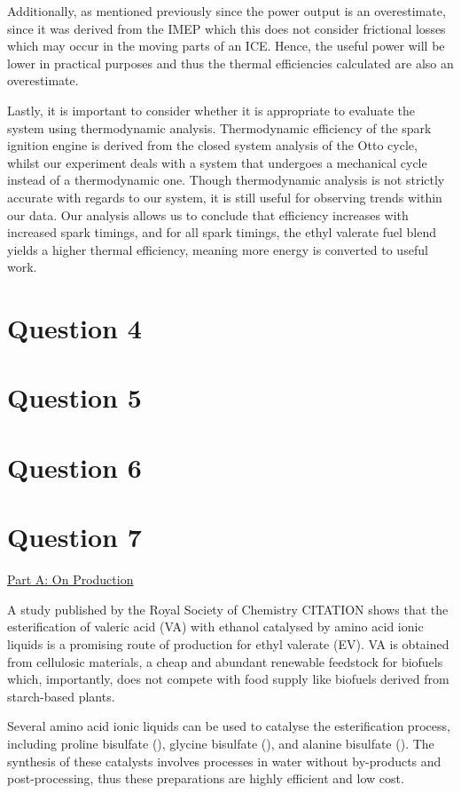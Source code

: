 \documentclass[11pt]{article}
\begin{document}
Additionally, as mentioned previously since the power output is an overestimate, since it was derived from the IMEP which this does not consider frictional losses which may occur in the moving parts of an ICE. Hence, the useful power will be lower in practical purposes and thus the thermal efficiencies calculated are also an overestimate. 

Lastly, it is important to consider whether it is appropriate to evaluate the system using thermodynamic analysis. Thermodynamic efficiency of the spark ignition engine is derived from the closed system analysis of the Otto cycle, whilst our experiment deals with a system that undergoes a mechanical cycle instead of a thermodynamic one. Though thermodynamic analysis is not strictly accurate with regards to our system, it is still useful for observing trends within our data. Our analysis allows us to conclude that efficiency increases with increased spark timings, and for all spark timings, the ethyl valerate fuel blend yields a higher thermal efficiency, meaning more energy is converted to useful work.  
\section*{Question 4}
\section*{Question 5}
\section*{Question 6}
\section*{Question 7}
{\centering
  \underline{Part A: On Production}\par
}

A study published by the Royal Society of Chemistry CITATION shows that the esterification of valeric acid (VA) with ethanol catalysed by amino acid ionic liquids is a promising route of production for ethyl valerate (EV). VA is obtained from cellulosic materials, a cheap and abundant renewable feedstock for biofuels which, importantly, does not compete with food supply like biofuels derived from starch-based plants.

Several amino acid ionic liquids can be used to catalyse the esterification process, including proline bisulfate (), glycine bisulfate (), and alanine bisulfate (). The synthesis of these catalysts involves processes in water without by-products and post-processing, thus these preparations are highly efficient and low cost. 
\end{document}
